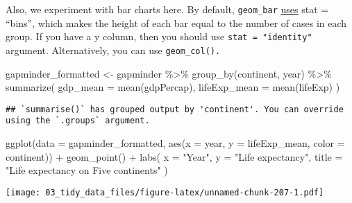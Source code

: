 \documentclass[
]{book}
\newenvironment{Shaded}{\begin{snugshade}}{\end{snugshade}}
\newcommand{\AttributeTok}[1]{\textcolor[rgb]{0.77,0.63,0.00}{#1}}
\newcommand{\FunctionTok}[1]{\textcolor[rgb]{0.00,0.00,0.00}{#1}}
\newcommand{\NormalTok}[1]{#1}
\newcommand{\OtherTok}[1]{\textcolor[rgb]{0.56,0.35,0.01}{#1}}
\newcommand{\SpecialCharTok}[1]{\textcolor[rgb]{0.00,0.00,0.00}{#1}}
\newcommand{\StringTok}[1]{\textcolor[rgb]{0.31,0.60,0.02}{#1}}
\begin{document}
Also, we experiment with bar charts here. By default, \texttt{geom\_bar} \href{https://www.rdocumentation.org/packages/ggplot2/versions/1.0.1/topics/geom_bar}{uses} stat = ``bins'', which makes the height of each bar equal to the number of cases in each group. If you have a y column, then you should use \texttt{stat\ =\ "identity"} argument. Alternatively, you can use \texttt{geom\_col().}

\begin{Shaded}
\begin{Highlighting}[]
\NormalTok{gapminder\_formatted }\OtherTok{\textless{}{-}}\NormalTok{ gapminder }\SpecialCharTok{\%\textgreater{}\%}
  \FunctionTok{group\_by}\NormalTok{(continent, year) }\SpecialCharTok{\%\textgreater{}\%}
  \FunctionTok{summarize}\NormalTok{(}
    \AttributeTok{gdp\_mean =} \FunctionTok{mean}\NormalTok{(gdpPercap),}
    \AttributeTok{lifeExp\_mean =} \FunctionTok{mean}\NormalTok{(lifeExp)}
\NormalTok{  )}
\end{Highlighting}
\end{Shaded}

\begin{verbatim}
## `summarise()` has grouped output by 'continent'. You can override using the `.groups` argument.
\end{verbatim}

\begin{Shaded}
\begin{Highlighting}[]
\FunctionTok{ggplot}\NormalTok{(}\AttributeTok{data =}\NormalTok{ gapminder\_formatted, }\FunctionTok{aes}\NormalTok{(}\AttributeTok{x =}\NormalTok{ year, }\AttributeTok{y =}\NormalTok{ lifeExp\_mean, }\AttributeTok{color =}\NormalTok{ continent)) }\SpecialCharTok{+}
  \FunctionTok{geom\_point}\NormalTok{() }\SpecialCharTok{+}
  \FunctionTok{labs}\NormalTok{(}
    \AttributeTok{x =} \StringTok{"Year"}\NormalTok{,}
    \AttributeTok{y =} \StringTok{"Life expectancy"}\NormalTok{,}
    \AttributeTok{title =} \StringTok{"Life expectancy on Five continents"}
\NormalTok{  )}
\end{Highlighting}
\end{Shaded}

\texttt{[image: 03\_tidy\_data\_files/figure-latex/unnamed-chunk-207-1.pdf]}
\end{document}
